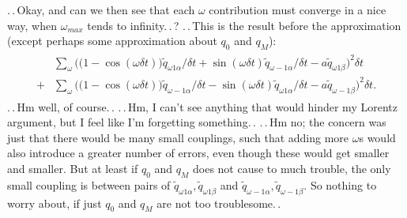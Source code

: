 \documentclass{report}
\begin{document}
.\,.\,Okay, and can we then see that each $\omega$ contribution must converge in a nice way, when $\omega_{max}$ tends to infinity.\,.\,? .\,.\,This is the result before the approximation (except perhaps some approximation about $q_0$ and $q_M$):
\begin{align}
\begin{aligned}
	&\sum_{\omega}
		\Big(
			\big(1 - \cos(\omega\delta t)\big) \tilde q_{\omega 1\alpha}  / \delta t +
			\sin(\omega\delta t) \tilde q_{\omega-1\alpha} / \delta t -
			a \tilde q_{\omega 1\beta}
		\Big)^2 
		\delta t\\
	+&\sum_{\omega}
		\Big(
			\big(1 - \cos(\omega\delta t)\big) \tilde q_{\omega-1\alpha}  / \delta t -
			\sin(\omega\delta t) \tilde q_{\omega 1\alpha} / \delta t -
			a \tilde q_{\omega-1\beta}
		\Big)^2 
		\delta t.
	\label{eq_3.66}
\end{aligned}
\end{align}
.\,.\,Hm well, of course.\,. .\,.\,Hm, I can't see anything that would hinder my Lorentz argument, but I feel like I'm forgetting something.\,. %
.\,.\,Hm no; the concern was just that there would be many small couplings, such that adding more $\omega$s would also introduce a greater number of errors, even though these would get smaller and smaller. But at least if $q_0$ and $q_M$ does not cause to much trouble, the only small coupling is between pairs of $\tilde q_{\omega 1\alpha}, \tilde q_{\omega 1\beta}$ and $\tilde q_{\omega-1\alpha}, \tilde q_{\omega-1\beta}$. So nothing to worry about, if just $q_0$ and $q_M$ are not too troublesome.\,. 

\end{document}
